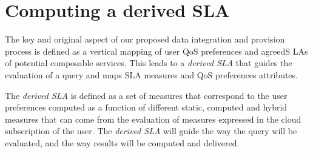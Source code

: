 \section{Computing a derived SLA}
\label{sec:derivedSla}

The key and original aspect of  our proposed data integration and provision process is  defined as a vertical mapping of user QoS preferences and agreedS LAs of potential composable services. This  leads to a {\em derived SLA} that guides the evaluation of a query and maps SLA measures and QoS preferences attributes.  




The {\em derived SLA} is defined as a set of measures that correspond to the user preferences computed as a function of different static, computed and hybrid measures that can come from the evaluation of measures expressed in the cloud subscription of the user. 
The {\em derived SLA}  will guide the way the query will be evaluated, and the way results will be computed and delivered.

